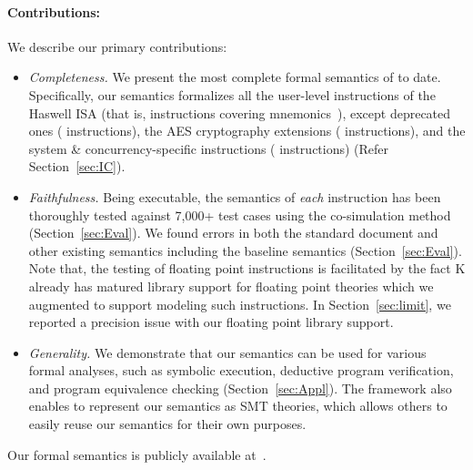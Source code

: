 \paragraph{Contributions:}
%
We describe our primary contributions:

\begin{itemize}
\item
\emph{Completeness.}
We present the most complete formal semantics of \ISA to date.
Specifically, our semantics formalizes all the user-level instructions of the \ISA Haswell ISA (that is,
\currentIS{} instructions covering \currentIntel{} mnemonics~\cite{IntelManual}), except deprecated ones (\Xmmx{} instructions),
the AES cryptography extensions (\crypto{} instructions), and the system \& concurrency-specific instructions (\system{} instructions) (Refer Section~\ref{sec:IC}).
\item
\emph{Faithfulness.}
Being executable, the semantics of \emph{each} instruction has been thoroughly tested against 7,000+ test cases using the co-simulation method (Section~\ref{sec:Eval}).
We found errors in both the \ISA standard document and other existing semantics including the baseline semantics (Section~\ref{sec:Eval}). Note that, the testing of floating point instructions is facilitated by the fact K already has matured library support for floating point theories which we augmented to support modeling such instructions. In Section~\ref{sec:limit}, we reported a precision issue with our floating point library support.
\item
\emph{Generality.}
We demonstrate that our semantics can be used for various formal analyses, such as symbolic execution, deductive program verification, and program equivalence checking (Section~\ref{sec:Appl}).
The \K framework also enables to represent our semantics as SMT theories,
which allows others to easily reuse our semantics for their own purposes.
\end{itemize}
%
Our formal semantics is publicly available at~\cite{Suppl}.


